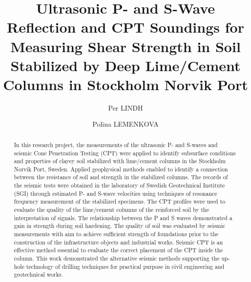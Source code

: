 \documentclass[final,3p,times,onecolumn,authoryear]{elsarticle}
\begin{document}
\begin{frontmatter}

\title{\textbf{Ultrasonic P- and S-Wave Reflection and CPT Soundings for Measuring Shear Strength in Soil Stabilized by Deep Lime/Cement Columns in Stockholm Norvik Port}}

\author[label1,label2]{Per LINDH}


\author[label3]{Polina LEMENKOVA}

\begin{abstract} In this research project, the measurements of the ultrasonic P- and S-waves and seismic Cone Penetration Testing (CPT) were applied to identify subsurface conditions and properties of clayey soil stabilized with lime/cement columns in the Stockholm Norvik Port, Sweden. Applied geophysical methods enabled to identify a connection between the resistance of soil and strength in the stabilized columns. The records of the seismic tests were obtained in the laboratory of Swedish Geotechnical Institute (SGI) through estimated P- and S-wave velocities using techniques of resonance frequency measurement of the stabilized specimens. The CPT profiles were used to evaluate the quality of the lime/cement columns of the reinforced soil by the interpretation of signals. The relationship between the P and S waves demonstrated a gain in strength during soil hardening. The quality of soil was evaluated by seismic measurements with aim to achieve sufficient strength of foundations prior to the construction of the infrastructure objects and industrial works. Seismic CPT is an effective method essential to evaluate the correct placement of the CPT inside the column. This work demonstrated the alternative seismic methods supporting the up-hole technology of drilling techniques for practical purpose in civil engineering and geotechnical works. 
\end{abstract}


\end{frontmatter}
\end{document}
